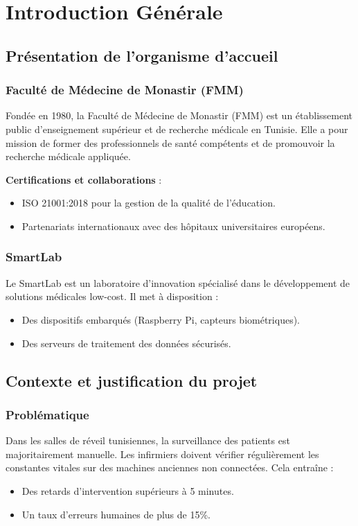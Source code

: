 

\chapter{Introduction Générale}

\section{Présentation de l’organisme d’accueil}
\subsection{Faculté de Médecine de Monastir (FMM)}
Fondée en 1980, la Faculté de Médecine de Monastir (FMM) est un établissement public d’enseignement supérieur et de recherche médicale en Tunisie. Elle a pour mission de former des professionnels de santé compétents et de promouvoir la recherche médicale appliquée.

\textbf{Certifications et collaborations} :
\begin{itemize}
  \item ISO 21001:2018 pour la gestion de la qualité de l’éducation.
  \item Partenariats internationaux avec des hôpitaux universitaires européens.
\end{itemize}

\subsection{SmartLab}
Le SmartLab est un laboratoire d’innovation spécialisé dans le développement de solutions médicales low-cost. Il met à disposition :
\begin{itemize}
  \item Des dispositifs embarqués (Raspberry Pi, capteurs biométriques).
  \item Des serveurs de traitement des données sécurisés.
\end{itemize}

\section{Contexte et justification du projet}
\subsection{Problématique}
Dans les salles de réveil tunisiennes, la surveillance des patients est majoritairement manuelle. Les infirmiers doivent vérifier régulièrement les constantes vitales sur des machines anciennes non connectées. Cela entraîne :
\begin{itemize}
  \item Des retards d’intervention supérieurs à 5 minutes.
  \item Un taux d’erreurs humaines de plus de 15\%.
\end{itemize}

